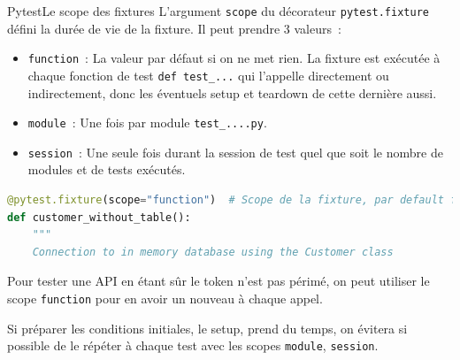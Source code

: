 \documentclass{beamer}
\begin{document}
    \begin{frame}[fragile]{Pytest}{Le scope des fixtures}
        \transdissolve
        L'argument \lstinline{scope} du décorateur \lstinline{pytest.fixture} défini la durée de vie
        de la fixture.
        Il peut prendre 3 valeurs~:
        \begin{itemize}
            \item \lstinline{function}~: La valeur par défaut si on ne met rien.
            La fixture est exécutée à chaque fonction de test \lstinline{def test_...} qui l'appelle directement ou indirectement, donc les éventuels setup et teardown de cette dernière aussi.
            \item \lstinline{module}~: Une fois par module \lstinline{test_....py}.
            \item \lstinline{session}~: Une seule fois durant la session de test quel que soit le nombre de modules et de tests exécutés.
        \end{itemize}
        \begin{lstlisting}[language=Python]
@pytest.fixture(scope="function")  # Scope de la fixture, par default function
def customer_without_table():
    """
    Connection to in memory database using the Customer class
        \end{lstlisting}

        Pour tester une API en étant sûr le token n'est pas périmé, on peut utiliser le scope \lstinline{function} pour en avoir un nouveau à chaque appel.

        Si préparer les conditions initiales, le setup, prend du temps, on évitera si possible de le répéter à chaque test avec les scopes \lstinline{module}, \lstinline{session}.
    \end{frame}
\end{document}
